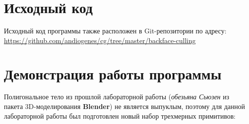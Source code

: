 \documentclass[a4paper,12pt]{article}
\begin{document}
\section{\normalsize{Исходный код}}
Исходный код программы также расположен в Git-репозитории по адресу: \url{https://github.com/andiogenes/cg/tree/master/backface-culling}

\section{\normalsize{Демонстрация работы программы}}
\begin{flushleft}
  Полигональное тело из прошлой лабораторной работы (\textit{обезьяна Сьюзен} из пакета 3D-моделирования \textbf{Blender}) не является выпуклым, поэтому для данной лабораторной работы был подготовлен новый набор трехмерных примитивов:
\end{flushleft}
\end{document}
